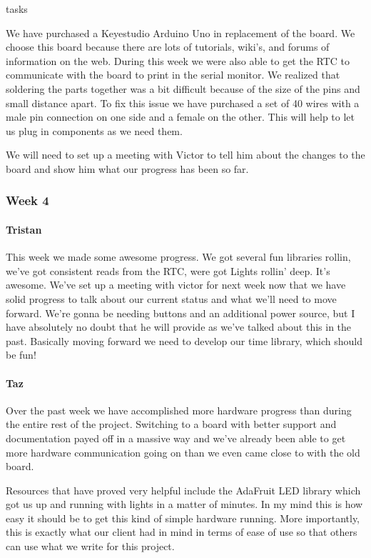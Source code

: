 tasks\documentclass[onecolumn, draftclsnofoot,10pt, compsoc]{IEEEtran}
\begin{document}
We have purchased a Keyestudio Arduino Uno in replacement of the board. We choose this board because there are lots of tutorials, wiki's, and forums of information on the web. During this week we were also able to get the RTC to communicate with the board to print in the serial monitor. We realized that soldering the parts together was a bit difficult because of the size of the pins and small distance apart. To fix this issue we have purchased a set of 40 wires with a male pin connection on one side and a female on the other. This will help to let us plug in components as we need them.

We will need to set up a meeting with Victor to tell him about the changes to the board and show him what our progress has been so far.
\subsubsection{Week 4}
\paragraph{Tristan}
This week we made some awesome progress. We got several fun libraries rollin, we've got consistent reads from the RTC, were got Lights rollin' deep. It's awesome. We've set up a meeting with victor for next week now that we have solid progress to talk about our current status and what we'll need to move forward. We're gonna be needing buttons and an additional power source, but I have absolutely no doubt that he will provide as we've talked about this in the past. Basically moving forward we need to develop our time library, which should be fun!
\paragraph{Taz}
Over the past week we have accomplished more hardware progress than during the entire rest of the project. Switching to a board with better support and documentation payed off in a massive way and we've already been able to get more hardware communication going on than we even came close to with the old board.

Resources that have proved very helpful include the AdaFruit LED library which got us up and running with lights in a matter of minutes. In my mind this is how easy it should be to get this kind of simple hardware running. More importantly, this is exactly what our client had in mind in terms of ease of use so that others can use what we write for this project.
\end{document}
